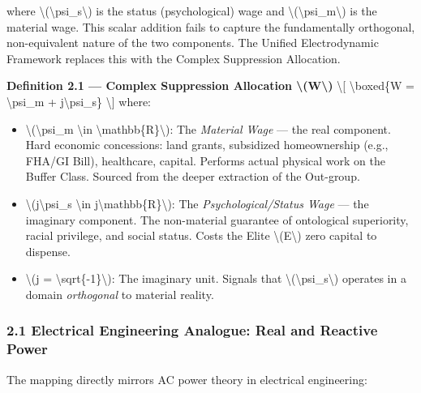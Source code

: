 where \textbackslash(\textbackslash psi\_s\textbackslash) is the status
(psychological) wage and
\textbackslash(\textbackslash psi\_m\textbackslash) is the material
wage. This scalar addition fails to capture the fundamentally
orthogonal, non-equivalent nature of the two components. The Unified
Electrodynamic Framework replaces this with the Complex Suppression
Allocation.

\textbf{Definition 2.1 --- Complex Suppression Allocation
\textbackslash(W\textbackslash)} \textbackslash{[}
\textbackslash boxed\{W = \textbackslash psi\_m +
j\textbackslash psi\_s\} \textbackslash{]} where:

\begin{itemize}
\tightlist
\item
  \textbackslash(\textbackslash psi\_m \textbackslash in
  \textbackslash mathbb\{R\}\textbackslash): The \emph{Material Wage}
  --- the real component. Hard economic concessions: land grants,
  subsidized homeownership (e.g., FHA/GI Bill), healthcare, capital.
  Performs actual physical work on the Buffer Class. Sourced from the
  deeper extraction of the Out-group.
\item
  \textbackslash(j\textbackslash psi\_s \textbackslash in
  j\textbackslash mathbb\{R\}\textbackslash): The
  \emph{Psychological/Status Wage} --- the imaginary component. The
  non-material guarantee of ontological superiority, racial privilege,
  and social status. Costs the Elite \textbackslash(E\textbackslash)
  zero capital to dispense.
\item
  \textbackslash(j = \textbackslash sqrt\{-1\}\textbackslash): The
  imaginary unit. Signals that
  \textbackslash(\textbackslash psi\_s\textbackslash) operates in a
  domain \emph{orthogonal} to material reality.
\end{itemize}

\subsubsection{2.1 Electrical Engineering Analogue: Real and Reactive
Power}\label{electrical-engineering-analogue-real-and-reactive-power}

The mapping directly mirrors AC power theory in electrical engineering:


